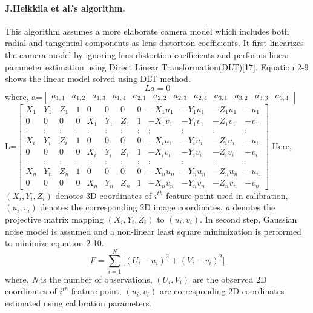 \paragraph{J.Heikkila et al.'s algorithm.}  
This algorithm assumes a more elaborate camera model which includes both radial and tangential components as lens distortion coefficients. It first linearizes the camera model by ignoring lens distortion coefficients and performs linear parameter estimation using Direct Linear Transformation(DLT)[17]. Equation 2-9 shows the linear model solved using DLT method.\newline  
\begin{equation}  
La=0  
\end{equation}\newline  
\noindent  
where,\newline   
a=$\begin{bmatrix}  
a_{1,1} & a_{1,2} & a_{1,3} & a_{1,4} & a_{2,1} & a_{2,2} & a_{2,3} & a_{2,4} & a_{3,1} & a_{3,2} & a_{3,3} & a_{3,4}   
\end{bmatrix}$\newline  
\newline  
L=$\begin{bmatrix}  
X_1 & Y_1 & Z_1 & 1 & 0 & 0 & 0 & 0 & -X_1u_1 & -Y_1u_1 & -Z_1u_1 & -u_1 \\  
0 & 0 & 0 & 0 & X_1 & Y_1 & Z_1 & 1 & -X_1v_1 & -Y_1v_1 & -Z_1v_1 & -v_1 \\    
: & : & : & : &  :  &  :  &  :  & : &   :     &    :    &    :    &   : \\  
X_i & Y_i & Z_i & 1 & 0 & 0 & 0 & 0 & -X_iu_i & -Y_iu_i & -Z_iu_i & -u_i \\  
0 & 0 & 0 & 0 & X_i & Y_i & Z_i & 1 & -X_iv_i & -Y_iv_i & -Z_iv_i & -v_i \\  
: & : & : & : &  :  &  :  &  :  & : &   :     &    :    &    :    &   : \\  
X_n & Y_n & Z_n & 1 & 0 & 0 & 0 & 0 & -X_nu_n & -Y_nu_n & -Z_nu_n & -u_n \\  
0 & 0 & 0 & 0 & X_n & Y_n & Z_n & 1 & -X_nv_n & -Y_nv_n & -Z_nv_n & -v_n   
\end{bmatrix}$ \newline  
\newline  
\newline  
\noindent  
Here, $(X_i,Y_i,Z_i)$ denotes 3D coordinates of $i^{th}$ feature point used in calibration, $(u_i,v_i)$ denotes the corresponding 2D image coordinates, \textit{a} denotes the projective matrix mapping $(X_i,Y_i,Z_i)$ to $(u_i,v_i)$.  
In second step, Gaussian noise model is assumed and a non-linear least square minimization is performed to minimize equation 2-10.\newline    
\begin{equation}  
F=\sum_{i=1}^N\big[(U_i-u_i)^2+(V_i-v_i)^2\big]  
\end{equation}  
\noindent  
where, \textit{N} is the number of observations, $(U_i,V_i)$ are the observed 2D coordinates of $i^{th}$ feature point, $(u_i,v_i)$ are corresponding 2D coordinates estimated using calibration parameters.  
  
